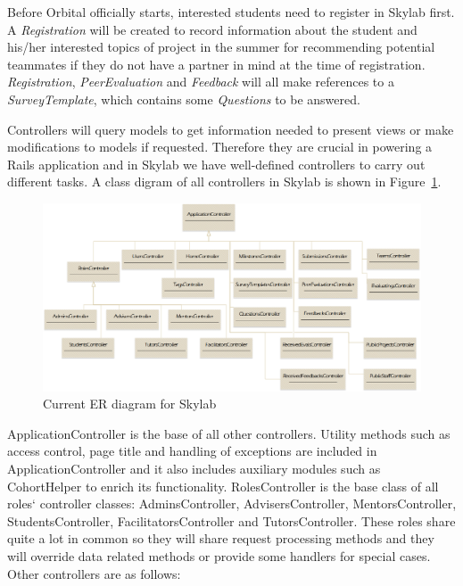 Before Orbital officially starts, interested students need to register in Skylab first. A \textit{Registration} will be created to record information about the student and his/her interested topics of project in the summer for recommending potential teammates if they do not have a partner in mind at the time of registration. \textit{Registration}, \textit{PeerEvaluation} and \textit{Feedback} will all make references to a \textit{SurveyTemplate}, which contains some \textit{Questions} to be answered.

Controllers will query models to get information needed to present views or make modifications to models if requested. Therefore they are crucial in powering a Rails application and in Skylab we have well-defined controllers to carry out different tasks. A class digram of all controllers in Skylab is shown in Figure~\ref{fig:SkylabControllers}.

\begin{figure}[h]
  \centering
  \includegraphics[width=\textwidth]{Images/Skylab_Controllers.png}
  \caption{Current ER diagram for Skylab}
  \label{fig:SkylabControllers}
\end{figure}

ApplicationController is the base of all other controllers. Utility methods such as access control, page title and handling of exceptions are included in ApplicationController and it also includes auxiliary modules such as CohortHelper to enrich its functionality. RolesController is the base class of all roles` controller classes: AdminsController, AdvisersController, MentorsController, StudentsController, FacilitatorsController and TutorsController. These roles share quite a lot in common so they will share request processing methods and they will override data related methods or provide some handlers for special cases. Other controllers are as follows:

